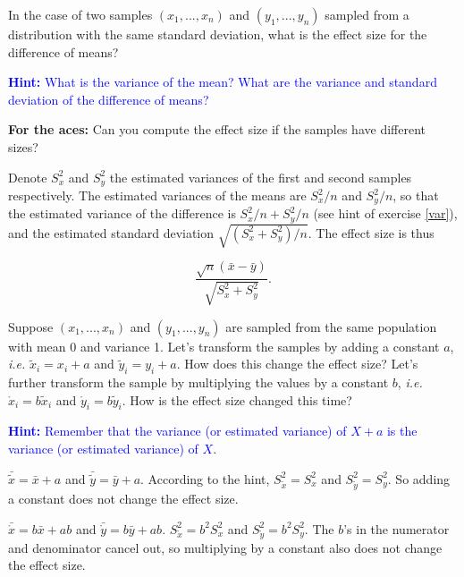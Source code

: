 \documentclass[a4paper]{article}
\theoremstyle{definition}
\begin{document}
\begin{Exercise}
\label{efsize}
In the case of two samples $(x_1, ..., x_n)$ and $(y_1, ..., y_n)$
sampled from a distribution with the same standard deviation, what
is the effect size for the difference of means?
\par\noindent\textcolor{Blue}{\textbf{Hint:} What is the variance
of the mean? What are the variance and standard deviation of the
difference of means?}
\par\noindent\textcolor{BrickRed}{\textbf{For the aces:} Can you
compute the effect size if the samples have different sizes?}
\end{Exercise}
\begin{Answer}
Denote $S^2_x$ and $S^2_y$ the estimated variances of the first
and second samples respectively. The estimated variances of the
means are $S^2_x/n$ and $S^2_y/n$, so that the estimated
variance of the difference is $S^2_x/n+S^2_y/n$ (see hint of
exercise \ref{var}), and the estimated standard deviation
$\sqrt{(S^2_x+S^2_y)/n}$. The effect size is thus

\begin{equation}
  \frac{\sqrt{n}(\bar{x} - \bar{y})}{\sqrt{S_x^2 + S_y^2}}.
\end{equation}
\end{Answer}

\begin{Exercise}
Suppose $(x_1, ..., x_n)$ and $(y_1, ..., y_n)$ are sampled from
the same population with mean 0 and variance 1. Let's transform
the samples by adding a constant $a$, \textit{i.e.}
$\tilde{x}_i = x_i + a$ and $\tilde{y}_i = y_i + a$. How does
this change the effect size? Let's further transform the sample
by multiplying the values by a constant $b$, \textit{i.e.}
$\mathring{x}_i = b\tilde{x}_i$ and $\mathring{y}_i = b\tilde{y}_i$.
How is the effect size changed this time?
\par\noindent\textcolor{Blue}{\textbf{Hint:} Remember that the
variance (or estimated variance) of $X + a$ is the variance (or
estimated variance) of $X$}.
\end{Exercise}
\begin{Answer}
$\bar{\tilde{x}} = \bar{x} + a$ and $\bar{\tilde{y}} = \bar{y} + a$.
According to the hint, $S^2_{\tilde{x}} = S^2_x$ and
$S^2_{\tilde{y}} = S^2_y$. So adding a constant does not change the
effect size.
\par
$\bar{\mathring{x}} = b\bar{x} + ab$ and $\bar{\mathring{y}} = b\bar{y} + ab$.
$S^2_{\mathring{x}} = b^2S^2_x$ and $S^2_{\mathring{y}} = b^2S^2_y$.
The $b$'s in the numerator and denominator cancel out, so multiplying by
a constant also does not change the effect size.
\end{Answer}
\end{document}
